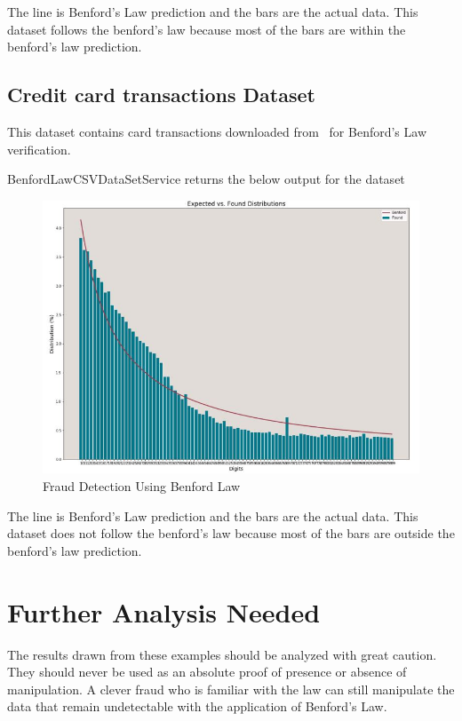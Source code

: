 The line is Benford’s Law prediction and the bars are 
the actual data. This dataset follows the benford's law
because most of the bars are within the benford's law prediction.


\subsection{Credit card transactions Dataset}
This dataset contains card transactions downloaded 
from~\cite{hid-sp18-514-purchase-card-desc}
for Benford's Law verification.

BenfordLawCSVDataSetService returns the below
output for the dataset~\cite{hid-sp18-514-purchase-card-ds}

\begin{figure}[!ht]
\centering\includegraphics[width=\columnwidth]{images/ben_card_trx.JPG}
  \caption{Fraud Detection Using Benford Law}\label{f:card-ds-benfordlaw}
\end{figure}

The line is Benford’s Law prediction and the bars are 
the actual data. This dataset does not follow the benford's law
because most of the bars are outside the benford's law prediction.


\section{Further Analysis Needed}
The results drawn from these examples should 
be analyzed with great caution. They should 
never be used as an absolute proof of presence 
or absence of manipulation. A clever fraud who 
is familiar with the law can still manipulate 
the data that remain undetectable with the 
application of Benford’s Law.

